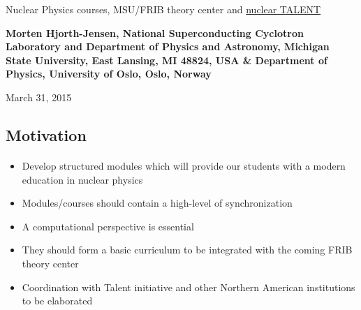 \documentclass[%
twoside,                 %
final,                   %
10pt]{article}
\begin{document}




\thispagestyle{empty}

\begin{center}
{\LARGE\bf
\begin{spacing}{1.25}
Nuclear Physics courses, MSU/FRIB theory center and \href{{http://www.nucleartalent.org}}{nuclear TALENT}
\end{spacing}
}
\end{center}


\begin{center}
{\bf Morten Hjorth-Jensen, National Superconducting Cyclotron Laboratory and Department of Physics and Astronomy, Michigan State University, East Lansing, MI 48824, USA {\&} Department of Physics, University of Oslo, Oslo, Norway${}^{}$} \\ [0mm]
\end{center}

    \begin{center}
\end{center}
    

\begin{center} %
March 31, 2015
\end{center}

\vspace{1cm}


\subsection*{Motivation}

\paragraph{}
\begin{itemize}
\item Develop structured modules which will provide our students with a modern education in nuclear physics

\item Modules/courses should contain a high-level of synchronization

\item A computational perspective is essential

\item They should form a basic curriculum to be integrated with the coming FRIB theory center

\item Coordination with Talent initiative and other Northern American institutions to be elaborated
\end{itemize}
\end{document}
